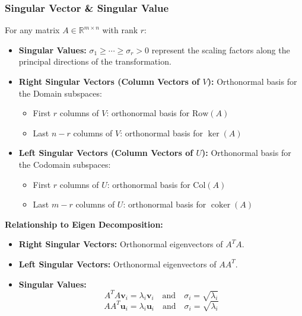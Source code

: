 \documentclass{article}
\begin{document}
\subsubsection{Singular Vector \& Singular Value}
For any matrix $A \in \mathbb{R}^{m \times n}$ with rank $r$:
\begin{itemize}
    \item \textbf{Singular Values:} $\sigma_1 \geq \cdots \geq \sigma_r > 0$ represent the scaling factors along the principal directions of the transformation.
    \item \textbf{Right Singular Vectors (Column Vectors of $V$):} Orthonormal basis for the Domain subspaces:
        \begin{itemize}
            \item First $r$ columns of $V$: orthonormal basis for $\text{Row}(A)$
            \item Last $n-r$ columns of $V$: orthonormal basis for $\ker(A)$
        \end{itemize}
    \item \textbf{Left Singular Vectors (Column Vectors of $U$):} Orthonormal basis for the Codomain subspaces:
        \begin{itemize}
            \item First $r$ columns of $U$: orthonormal basis for $\text{Col}(A)$
            \item Last $m-r$ columns of $U$: orthonormal basis for $\operatorname{coker}(A)$
        \end{itemize}
\end{itemize}
\textbf{Relationship to Eigen Decomposition:}
\begin{itemize}
    \item \textbf{Right Singular Vectors:}  Orthonormal eigenvectors of $A^T A$.
    \item \textbf{Left Singular Vectors:} Orthonormal eigenvectors of $AA^T$.
    \item \textbf{Singular Values:}
    \[
        A^T A \mathbf{v}_i = \lambda_i \mathbf{v}_i \quad \text{and} \quad \sigma_i = \sqrt{\lambda_i}
    \]
    \[
        AA^T \mathbf{u}_i = \lambda_i \mathbf{u}_i \quad \text{and} \quad \sigma_i = \sqrt{\lambda_i}
    \]
\end{itemize}
\end{document}
